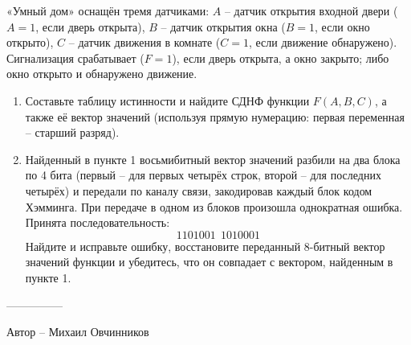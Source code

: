 \question
«Умный дом» оснащён тремя датчиками: $A$ -- датчик открытия входной двери ($A=1$, если дверь открыта), $B$ -- датчик открытия окна ($B=1$, если окно открыто), $C$ -- датчик движения в комнате ($C=1$, если движение обнаружено). Сигнализация срабатывает ($F=1$), если дверь открыта, а окно закрыто; либо окно открыто и обнаружено движение.

\begin{enumerate}
\item Составьте таблицу истинности и найдите СДНФ функции $F(A,B,C)$, а также её вектор значений (используя прямую нумерацию: первая переменная -- старший разряд).
\item Найденный в пункте 1 восьмибитный вектор значений разбили на два блока по 4 бита (первый -- для первых четырёх строк, второй -- для последних четырёх) и передали по каналу связи, закодировав каждый блок кодом Хэмминга. При передаче в одном из блоков произошла однократная ошибка. Принята последовательность:
\[
1101001\ \ 1010001
\]
Найдите и исправьте ошибку, восстановите переданный 8-битный вектор значений функции и убедитесь, что он совпадает с вектором, найденным в пункте 1.
\end{enumerate}
---------------

Автор -- Михаил Овчинников